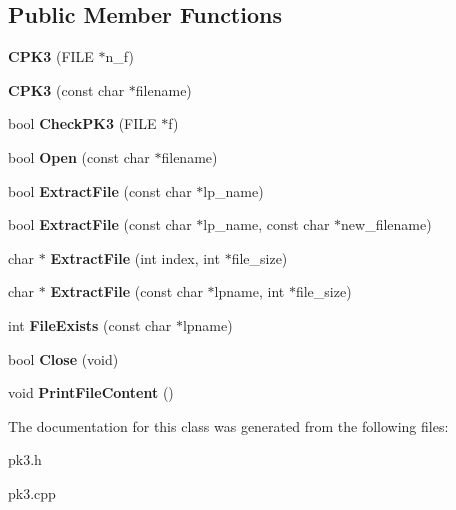 \subsection*{Public Member Functions}
\begin{DoxyCompactItemize}
\item 
{\bfseries C\+P\+K3} (F\+I\+LE $\ast$n\+\_\+f)\hypertarget{classCPK3_a751b0a005ed2797682729b89c3c31d5b}{}\label{classCPK3_a751b0a005ed2797682729b89c3c31d5b}

\item 
{\bfseries C\+P\+K3} (const char $\ast$filename)\hypertarget{classCPK3_a478d91d46879e20b646c48137f7b6c29}{}\label{classCPK3_a478d91d46879e20b646c48137f7b6c29}

\item 
bool {\bfseries Check\+P\+K3} (F\+I\+LE $\ast$f)\hypertarget{classCPK3_a4f349484a4b70f487739a793d0b3e17f}{}\label{classCPK3_a4f349484a4b70f487739a793d0b3e17f}

\item 
bool {\bfseries Open} (const char $\ast$filename)\hypertarget{classCPK3_afcb4e01f2dd69ee880a650fdbd7ee201}{}\label{classCPK3_afcb4e01f2dd69ee880a650fdbd7ee201}

\item 
bool {\bfseries Extract\+File} (const char $\ast$lp\+\_\+name)\hypertarget{classCPK3_a19542104e93786941297662202ae228c}{}\label{classCPK3_a19542104e93786941297662202ae228c}

\item 
bool {\bfseries Extract\+File} (const char $\ast$lp\+\_\+name, const char $\ast$new\+\_\+filename)\hypertarget{classCPK3_a825761aa10328e350b74a187a99d1df2}{}\label{classCPK3_a825761aa10328e350b74a187a99d1df2}

\item 
char $\ast$ {\bfseries Extract\+File} (int index, int $\ast$file\+\_\+size)\hypertarget{classCPK3_a07acb088e5a7e1c469f1afe3d883cc0c}{}\label{classCPK3_a07acb088e5a7e1c469f1afe3d883cc0c}

\item 
char $\ast$ {\bfseries Extract\+File} (const char $\ast$lpname, int $\ast$file\+\_\+size)\hypertarget{classCPK3_ab68d57ea69bb412b7d0cfb8c30aa0a07}{}\label{classCPK3_ab68d57ea69bb412b7d0cfb8c30aa0a07}

\item 
int {\bfseries File\+Exists} (const char $\ast$lpname)\hypertarget{classCPK3_abb17892071464307a7315c3f07171048}{}\label{classCPK3_abb17892071464307a7315c3f07171048}

\item 
bool {\bfseries Close} (void)\hypertarget{classCPK3_a986897457605fc34cc13c249a94e5ba5}{}\label{classCPK3_a986897457605fc34cc13c249a94e5ba5}

\item 
void {\bfseries Print\+File\+Content} ()\hypertarget{classCPK3_aa370be02375bb252289cdba3f52252bb}{}\label{classCPK3_aa370be02375bb252289cdba3f52252bb}

\end{DoxyCompactItemize}


The documentation for this class was generated from the following files\+:\begin{DoxyCompactItemize}
\item 
pk3.\+h\item 
pk3.\+cpp\end{DoxyCompactItemize}
